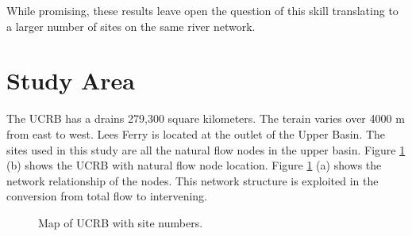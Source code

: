\documentclass[final,5p,times,twocolumn,authoryear]{elsarticle}
\begin{document}
While promising, these results leave open the question of this skill translating to a larger number of sites on the same river network. 


\section{Study Area}
The UCRB has a drains 279,300 square kilometers.  The terain varies over 4000 m from east to west. Lees Ferry is located at the outlet of the Upper Basin.  The sites used in this study are all the natural flow nodes in the upper basin.  Figure \ref{fig:map} (b) shows the UCRB with natural flow node location. Figure \ref{fig:map} (a) shows the network relationship of the nodes.  This network structure is exploited in the conversion from total flow to intervening. 


\begin{figure}[!htbp] %
   \centering
   
   
   \caption{Map of UCRB with site numbers.}
   \label{fig:map}
\end{figure}
\end{document}
